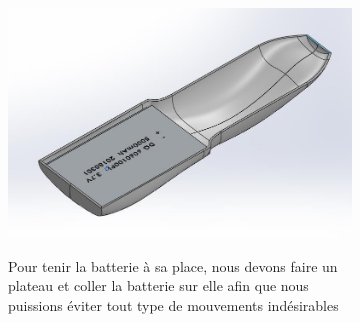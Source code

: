 \begin{figure}[!htbp]
    \centering
    \begin{subfigure}{.6\linewidth}
        \centering
        \includegraphics[width=\linewidth]{assets/conception1/img190.jpg}
    \end{subfigure}
    \hfill
    \begin{subfigure}[m]{.3\linewidth}
        Pour tenir la batterie à sa place, nous devons faire un plateau et coller la batterie sur elle afin que nous puissions éviter tout type de mouvements indésirables
    \end{subfigure}
\end{figure}

\FloatBarrier

